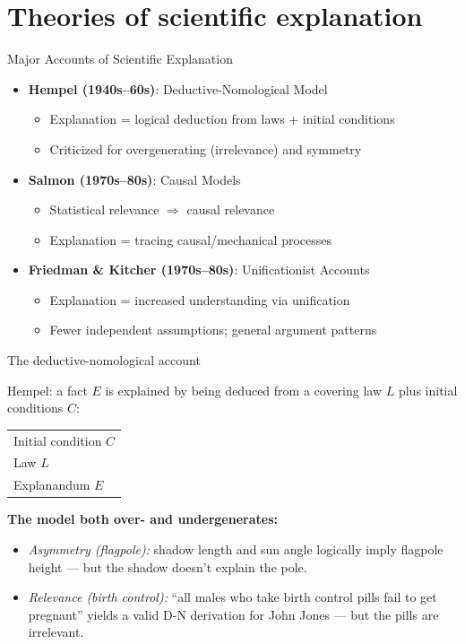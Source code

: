\documentclass[fleqn]{beamer}
\begin{document}
\section{Theories of scientific explanation}

\begin{frame}{Major Accounts of Scientific Explanation}

\scriptsize
\begin{itemize}
  \item \textbf{Hempel (1940s--60s)}: Deductive-Nomological Model
    \begin{itemize}
      \item Explanation = logical deduction from laws + initial conditions
      \item Criticized for overgenerating (irrelevance) and symmetry
    \end{itemize}
  \item \textbf{Salmon (1970s--80s)}: Causal Models
    \begin{itemize}
      \item Statistical relevance $\Rightarrow$ causal relevance
      \item Explanation = tracing causal/mechanical processes
    \end{itemize}
  \item \textbf{Friedman \& Kitcher (1970s--80s)}: Unificationist Accounts
    \begin{itemize}
      \item Explanation = increased understanding via unification
      \item Fewer independent assumptions; general argument patterns
    \end{itemize}
\end{itemize}

\end{frame}

\begin{frame}{The deductive-nomological account}

  Hempel: a fact $E$ is explained by being deduced from a covering law
  $L$ plus initial conditions $C$:

  \vspace{0.5em}
  \begin{tabular}{l}
  Initial condition $C$ \\
  Law $L$ \\ \hline
  Explanandum $E$
  \end{tabular}

  \vspace{0.8em}
  \textbf{The model both over- and undergenerates:}
  \begin{itemize}
  \item \emph{Asymmetry (flagpole):} shadow length and sun angle
    logically imply flagpole height --- but the shadow doesn't explain
    the pole.
  \item \emph{Relevance (birth control):} ``all males who take birth
    control pills fail to get pregnant'' yields a valid D-N derivation
    for John Jones --- but the pills are irrelevant.
  \end{itemize}

\end{frame}
\end{document}
